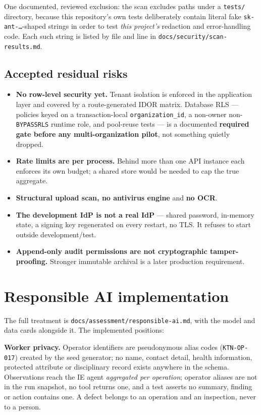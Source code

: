 \documentclass[11pt,a4paper]{article}
\begin{document}
One documented, reviewed exclusion: the scan excludes paths under a
\texttt{tests/} directory, because this repository's own tests deliberately
contain literal fake \texttt{sk-ant-\dots}-shaped strings in order to test
\emph{this project's} redaction and error-handling code. Each such string is
listed by file and line in \texttt{docs/security/scan-results.md}.

\subsection{Accepted residual risks}

\begin{itemize}
\item \textbf{No row-level security yet.} Tenant isolation is enforced in the
  application layer and covered by a route-generated IDOR matrix. Database RLS
  --- policies keyed on a transaction-local \texttt{organization\_id}, a
  non-owner non-\texttt{BYPASSRLS} runtime role, and pool-reuse tests --- is a
  documented \textbf{required gate before any multi-organization pilot}, not
  something quietly dropped.
\item \textbf{Rate limits are per process.} Behind more than one API instance
  each enforces its own budget; a shared store would be needed to cap the true
  aggregate.
\item \textbf{Structural upload scan, no antivirus engine} and \textbf{no OCR}.
\item \textbf{The development IdP is not a real IdP} --- shared password,
  in-memory state, a signing key regenerated on every restart, no TLS. It
  refuses to start outside development/test.
\item \textbf{Append-only audit permissions are not cryptographic
  tamper-proofing.} Stronger immutable archival is a later production
  requirement.
\end{itemize}

\section{Responsible AI implementation}

The full treatment is \texttt{docs/assessment/responsible-ai.md}, with the model
and data cards alongside it. The implemented positions:

\textbf{Worker privacy.} Operator identifiers are pseudonymous alias codes
(\texttt{KTN-OP-017}) created by the seed generator; no name, contact detail,
health information, protected attribute or disciplinary record exists anywhere
in the schema. Observations reach the IE agent \emph{aggregated per operation};
operator aliases are not in the run snapshot, no tool returns one, and a test
asserts no summary, finding or action contains one. A defect belongs to an
operation and an inspection, never to a person.
\end{document}
